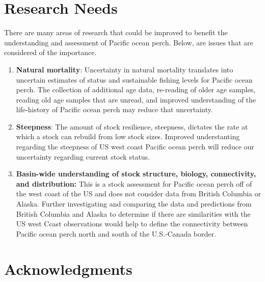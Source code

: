 \documentclass[12pt,]{article}
\begin{document}
\section{Research Needs}\label{research-needs}

There are many areas of research that could be improved to benefit the
understanding and assessment of Pacific ocean perch. Below, are issues
that are considered of the importance.

\begin{enumerate}

\item \textbf{Natural mortality}: Uncertainty in natural mortality translates into uncertain estimates of status and sustainable fishing levels for Pacific ocean perch. The collection of additional age data, re-reading of older age samples, reading old age samples that are unread, and improved understanding of the life-history of Pacific ocean perch may reduce that uncertainty.

\item \textbf{Steepness}: The amount of stock resilience, steepness, dictates the rate at which a stock can rebuild from low stock sizes.  Improved understanting regarding the steepness of US west coast Pacific ocean perch will reduce our uncertainty regarding current stock status.

\item \textbf{Basin-wide understanding of stock structure, biology, connectivity, and distribution:} This is a stock assessment for Pacific ocean perch off of the west coast of the US and does not consider data from British Columbia or Alaska. Further investigating and comparing the data and predictions from British Columbia and Alaska to determine if there are similarities with the US west Ccast observations would help to define the connectivity between Pacific ocean perch north and south of the U.S.-Canada border.

\end{enumerate}

\section{Acknowledgments}\label{acknowledgments}
\end{document}
